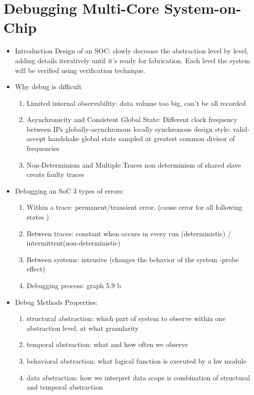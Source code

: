 \documentclass[conference]{IEEEtran}
\begin{document}
\section{Debugging Multi-Core System-on-Chip}
\begin{itemize}	
\item Introduction
		Design of an SOC: slowly decrease the abstraction level by level, adding details iteratively until it's ready for fabrication.
						  Each level the system will be verified using verification technique.
\item Why debug is difficult
	\begin{enumerate}
	\item Limited internal observability: data volume too big, can't be all recorded
	\item Asynchronicity and Consistent Global State: Different clock frequency between IPs
			globally-asynchronous locally synchronous design style: valid-accept handshake 
			global state sampled at greatest common divisor of frequencies
	\item Non-Determinism and Multiple Traces
			non determinism of shared slave create faulty traces
	\end{enumerate}			
\item Debugging an SoC
		3 types of errors:
		\begin {enumerate}
		\item Within a trace: permanent/transient error. (cause error for all following states )
		\item  Between traces: constant when occurs in every run (deterministic) / intermittent(non-deterministic)
		\item  Between systems: intrusive (changes the behavior of the system -probe effect)
		\item Debugging process:
			graph 5.9 b
		\end{enumerate}
\item Debug Methods
		Properties:
			\begin {enumerate}
			\item structural abstraction: which part of system to observe within one abstraction level, at what granularity
			\item temporal abstraction: what and how often we observe
			\item behavioral abstraction: what logical function is executed by a hw module
			\item data abstraction: how we interpret data
			scope is combination of structural and temporal abstraction

\end{enumerate}
\end{itemize}
\end{document}
